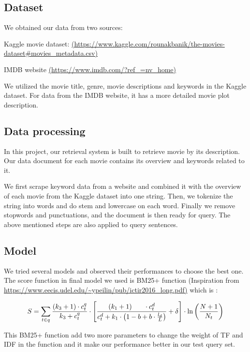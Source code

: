 \documentclass[letterpaper,10pt]{article}
\begin{document}
\begin{multicols}{2}
    \subsection{Dataset}
    We obtained our data from two sources:

    Kaggle movie dataset:
    \url{(https://www.kaggle.com/rounakbanik/the-movies-dataset#movies_metadata.csv)}

    IMDB website
    \url{(https://www.imdb.com/?ref_=nv_home)}
    
    We utilized the movie title, genre, movie descriptions and keywords in the Kaggle dataset. For data from the IMDB website, it has a more detailed movie plot description.

    \subsection{Data processing}

    In this project, our retrieval system is built to retrieve movie by its description.
    Our data document for each movie contains its overview and keywords related to it.

    We first scrape keyword data from a website and combined it with the overview of each movie from the Kaggle dataset into one string. Then,  we tokenize the string into words and do stem and lowercase on each word. Finally we remove stopwords and punctuations, and  the document is then ready for query. The above mentioned steps are also applied to query sentences.

    \subsection{Model}

    We tried several models and observed their performances to choose the best one. The score function in final model we used is BM25+ function (Inspiration from \url{https://www.eecis.udel.edu/~ypeilin/pub/ictir2016_long.pdf)} which is :

    {
    \tiny
    $$
        S = \sum_{t \in q} \frac{\left(k_{3}+1\right) \cdot c_{t}^{q}}{k_{3}+c_{t}^{q}} \cdot\left[\frac{\left(k_{1}+1\right) \\ \cdot c_{t}^{d}}{c_{t}^{d}+k_{1} \cdot\left(1-b+b \cdot \frac{l_{d}}{L}\right)}+\delta\right] \cdot \ln \left(\frac{N+1}{N_{t}}\right)
    $$
    }


    This BM25+ function add two more parameters to change the weight of TF and IDF in the function and it make our performance better in our test query set.


\end{multicols}
\end{document}
